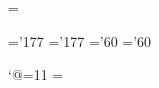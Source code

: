 \def\nopagenumber{\headline={\hfill}\footline={\hfill}}

\def\pageblanche{\vfill\eject\pagetitretrue
\null\vfill\eject
\pagetitretrue
}


\def\hautspages#1#2{\auteurcourant={\ninepcap#1}\titrecourant={\nineit#2}\MidFoliofalse}

\ifnum\chstart=\pageno \pagetitretrue\fi



\def\leftnote#1{\vadjust{\setbox1=\vtop{\hsize 20mm\parindent=0pt\eightpoint
\baselineskip=9pt\rightskip=4mm plus 4mm\vskip-4.7mm#1}\hbox{\kern-2cm\smash{\box1}}}}





\skewchar\eighti='177 \skewchar\sixi='177
\skewchar\eightsy='60 \skewchar\sixsy='60

%
%
%
\let\footnotea=\footnote
\catcode`@=11
\newinsert\footins
\def\footnote#1{\let\@sf\empty %
  \ifhmode\edef\@sf{\spacefactor\the\spacefactor}\/\fi
\hbox{$^{(#1)}$}\@sf\vfootnote{#1.}}
\def\vfootnote#1{\insert\footins\bgroup
  \interlinepenalty\interfootnotelinepenalty
  \splittopskip\ht\strutbox %
  \splitmaxdepth\dp\strutbox \floatingpenalty\@MM
  \leftskip\z@skip \rightskip\z@skip \spaceskip\z@skip \xspaceskip\z@skip
  \textindent{#1}\footstrut\futurelet\next\fo@t}
\def\fo@t{\ifcat\bgroup\noexpand\next \let\next\f@@t
  \else\let\next\f@t\fi \next}
\def\f@@t{\bgroup\aftergroup\@foot\let\next}
\def\f@t#1{#1\@foot}
\def\@foot{\strut\egroup}
\def\footstrut{\vbox to\splittopskip{}}
\skip\footins=\bigskipamount %
\count{} %
\dimen\footins=8in %

